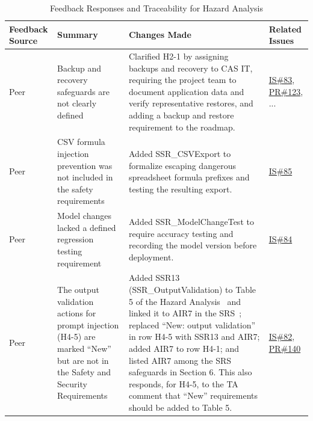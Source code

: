 \documentclass{article}
\begin{document}
\begin{longtable}{|p{2cm}|p{4cm}|p{5cm}|p{4cm}|}
\caption{Feedback Responses and Traceability for Hazard Analysis}
\label{Tbl-Hazard}\\

\hline
\textbf{Feedback Source} & \textbf{Summary} & \textbf{Changes Made} & \textbf{Related Issues} \\ 
\hline
\endhead

Peer & Backup and recovery safeguards are not clearly defined & Clarified H2-1 by assigning backups and recovery to CAS IT, requiring the project team to document application data and verify representative restores, and adding a backup and restore requirement to the roadmap. & \href{https://github.com/shivyam/cas-course-optimization/issues/83}{IS\#83}, \href{https://github.com/shivyam/cas-course-optimization/pull/123}{PR\#123}, ... \\
\hline
Peer & CSV formula injection prevention was not included in the safety requirements & Added SSR\_CSVExport to formalize escaping dangerous spreadsheet formula prefixes and testing the resulting export. & \href{https://github.com/shivyam/cas-course-optimization/issues/85}{IS\#85} \\
\hline
Peer & Model changes lacked a defined regression testing requirement & Added SSR\_ModelChangeTest to require accuracy testing and recording the model version before deployment. & \href{https://github.com/shivyam/cas-course-optimization/issues/84}{IS\#84} \\
\hline
Peer & The output validation actions for prompt injection (H4-5) are marked ``New'' but are not in the Safety and Security Requirements & Added SSR13 (SSR\_OutputValidation) to Table 5 of the Hazard Analysis~\citep{TeamBVSH2026HA} and linked it to AIR7 in the SRS~\citep{TeamBVSH2026SRS}; replaced ``New: output validation'' in row H4-5 with SSR13 and AIR7; added AIR7 to row H4-1; and listed AIR7 among the SRS safeguards in Section 6. This also responds, for H4-5, to the TA comment that ``New'' requirements should be added to Table 5. & \href{https://github.com/shivyam/cas-course-optimization/issues/82}{IS\#82}, \href{https://github.com/shivyam/cas-course-optimization/pull/140}{PR\#140} \\
\hline
\end{longtable}
\end{document}
